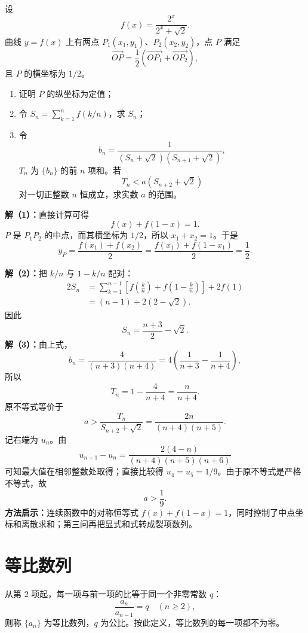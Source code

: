 \begin{examplebox}
  设
  \[
    f(x)=\frac{2^x}{2^x+\sqrt2}.
  \]
  曲线 $y=f(x)$ 上有两点 $P_1(x_1,y_1)$、$P_2(x_2,y_2)$，点 $P$ 满足
  \[
    \overrightarrow{OP}=\frac12
      \left(\overrightarrow{OP_1}+\overrightarrow{OP_2}\right),
  \]
  且 $P$ 的横坐标为 $1/2$。
  \begin{enumerate}
    \item 证明 $P$ 的纵坐标为定值；
    \item 令 $S_n=\sum_{k=1}^{n}f(k/n)$，求 $S_n$；
    \item 令
      \[
        b_n=\frac1{(S_n+\sqrt2)(S_{n+1}+\sqrt2)},
      \]
      $T_n$ 为 $\{b_n\}$ 的前 $n$ 项和。若
      \[
        T_n<a(S_{n+2}+\sqrt2)
      \]
      对一切正整数 $n$ 恒成立，求实数 $a$ 的范围。
  \end{enumerate}

  \textbf{解（1）：}直接计算可得
  \[
    f(x)+f(1-x)=1.
  \]
  $P$ 是 $P_1P_2$ 的中点，而其横坐标为 $1/2$，所以 $x_1+x_2=1$。于是
  \[
    y_P=\frac{f(x_1)+f(x_2)}2
       =\frac{f(x_1)+f(1-x_1)}2
       =\boxed{\frac12}.
  \]

  \textbf{解（2）：}把 $k/n$ 与 $1-k/n$ 配对：
  \begin{align*}
    2S_n
      &=\sum_{k=1}^{n-1}\left[f\left(\frac{k}{n}\right)
          +f\left(1-\frac{k}{n}\right)\right]+2f(1)\\
      &=(n-1)+2(2-\sqrt2).
  \end{align*}
  因此
  \[
    \boxed{S_n=\frac{n+3}{2}-\sqrt2}.
  \]
  \textbf{解（3）：}由上式，
  \[
    b_n=\frac4{(n+3)(n+4)}
       =4\left(\frac1{n+3}-\frac1{n+4}\right),
  \]
  所以
  \[
    T_n=1-\frac4{n+4}=\frac n{n+4}.
  \]
  原不等式等价于
  \[
    a>\frac{T_n}{S_{n+2}+\sqrt2}
      =\frac{2n}{(n+4)(n+5)}.
  \]
  记右端为 $u_n$。由
  \[
    u_{n+1}-u_n
      =\frac{2(4-n)}{(n+4)(n+5)(n+6)}
  \]
  可知最大值在相邻整数处取得；直接比较得 $u_4=u_5=1/9$。由于原不等式是严格不等式，故
  \[
    \boxed{a>\frac19}.
  \]
  \textbf{方法启示：}连续函数中的对称恒等式 $f(x)+f(1-x)=1$，同时控制了中点坐标和离散求和；第三问再把显式和式转成裂项数列。
\end{examplebox}

\section{等比数列}

\begin{definitionbox}[等比数列]
  从第 $2$ 项起，每一项与前一项的比等于同一个非零常数 $q$：
  \[
    \frac{a_n}{a_{n-1}}=q\quad(n\ge2),
  \]
  则称 $\{a_n\}$ 为等比数列，$q$ 为公比。按此定义，等比数列的每一项都不为零。
\end{definitionbox}

